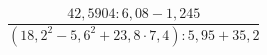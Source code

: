 \begin{ex}[type=calculate]
	\begin{condition}
		\( \dfrac{42,5904:6,08-1,245}{(18,2^2-5,6^2+23,8\cdot7,4):5,95+35,2} \)
	\end{condition}
\end{ex}